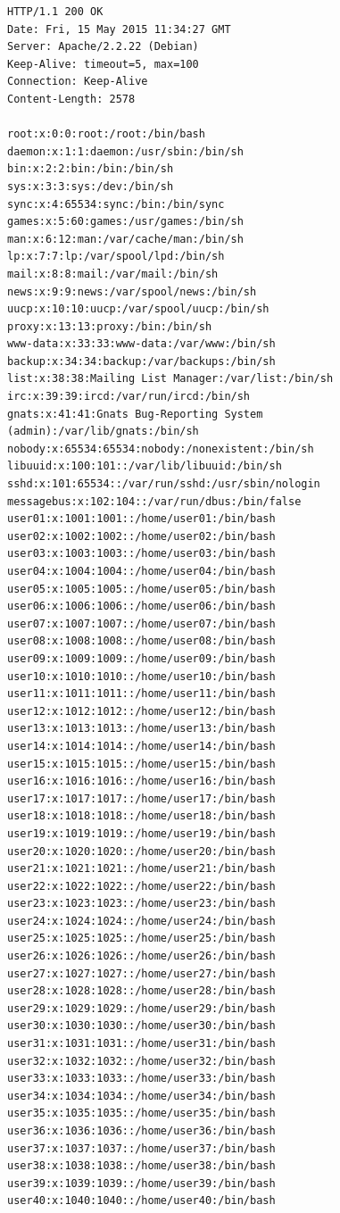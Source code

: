 \documentclass[12pt,a4paper,titlepage,oneside]{scrartcl}
\begin{document}
\begin{lstlisting}[caption=Response des Servers nach Exploit,style=simple]
HTTP/1.1 200 OK
Date: Fri, 15 May 2015 11:34:27 GMT
Server: Apache/2.2.22 (Debian)
Keep-Alive: timeout=5, max=100
Connection: Keep-Alive
Content-Length: 2578

root:x:0:0:root:/root:/bin/bash
daemon:x:1:1:daemon:/usr/sbin:/bin/sh
bin:x:2:2:bin:/bin:/bin/sh
sys:x:3:3:sys:/dev:/bin/sh
sync:x:4:65534:sync:/bin:/bin/sync
games:x:5:60:games:/usr/games:/bin/sh
man:x:6:12:man:/var/cache/man:/bin/sh
lp:x:7:7:lp:/var/spool/lpd:/bin/sh
mail:x:8:8:mail:/var/mail:/bin/sh
news:x:9:9:news:/var/spool/news:/bin/sh
uucp:x:10:10:uucp:/var/spool/uucp:/bin/sh
proxy:x:13:13:proxy:/bin:/bin/sh
www-data:x:33:33:www-data:/var/www:/bin/sh
backup:x:34:34:backup:/var/backups:/bin/sh
list:x:38:38:Mailing List Manager:/var/list:/bin/sh
irc:x:39:39:ircd:/var/run/ircd:/bin/sh
gnats:x:41:41:Gnats Bug-Reporting System (admin):/var/lib/gnats:/bin/sh
nobody:x:65534:65534:nobody:/nonexistent:/bin/sh
libuuid:x:100:101::/var/lib/libuuid:/bin/sh
sshd:x:101:65534::/var/run/sshd:/usr/sbin/nologin
messagebus:x:102:104::/var/run/dbus:/bin/false
user01:x:1001:1001::/home/user01:/bin/bash
user02:x:1002:1002::/home/user02:/bin/bash
user03:x:1003:1003::/home/user03:/bin/bash
user04:x:1004:1004::/home/user04:/bin/bash
user05:x:1005:1005::/home/user05:/bin/bash
user06:x:1006:1006::/home/user06:/bin/bash
user07:x:1007:1007::/home/user07:/bin/bash
user08:x:1008:1008::/home/user08:/bin/bash
user09:x:1009:1009::/home/user09:/bin/bash
user10:x:1010:1010::/home/user10:/bin/bash
user11:x:1011:1011::/home/user11:/bin/bash
user12:x:1012:1012::/home/user12:/bin/bash
user13:x:1013:1013::/home/user13:/bin/bash
user14:x:1014:1014::/home/user14:/bin/bash
user15:x:1015:1015::/home/user15:/bin/bash
user16:x:1016:1016::/home/user16:/bin/bash
user17:x:1017:1017::/home/user17:/bin/bash
user18:x:1018:1018::/home/user18:/bin/bash
user19:x:1019:1019::/home/user19:/bin/bash
user20:x:1020:1020::/home/user20:/bin/bash
user21:x:1021:1021::/home/user21:/bin/bash
user22:x:1022:1022::/home/user22:/bin/bash
user23:x:1023:1023::/home/user23:/bin/bash
user24:x:1024:1024::/home/user24:/bin/bash
user25:x:1025:1025::/home/user25:/bin/bash
user26:x:1026:1026::/home/user26:/bin/bash
user27:x:1027:1027::/home/user27:/bin/bash
user28:x:1028:1028::/home/user28:/bin/bash
user29:x:1029:1029::/home/user29:/bin/bash
user30:x:1030:1030::/home/user30:/bin/bash
user31:x:1031:1031::/home/user31:/bin/bash
user32:x:1032:1032::/home/user32:/bin/bash
user33:x:1033:1033::/home/user33:/bin/bash
user34:x:1034:1034::/home/user34:/bin/bash
user35:x:1035:1035::/home/user35:/bin/bash
user36:x:1036:1036::/home/user36:/bin/bash
user37:x:1037:1037::/home/user37:/bin/bash
user38:x:1038:1038::/home/user38:/bin/bash
user39:x:1039:1039::/home/user39:/bin/bash
user40:x:1040:1040::/home/user40:/bin/bash
\end{lstlisting}
\end{document}
